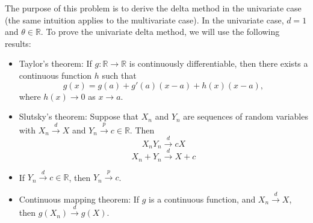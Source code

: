 \documentclass[11pt]{article}
\begin{document}
\noindent The purpose of this problem is to derive the delta method in the univariate case (the same intuition applies to the multivariate case). In the univariate case, $d = 1$ and $\theta \in \mathbb{R}$. To prove the univariate delta method, we will use the following results:
\begin{itemize}
\item Taylor's theorem: If $g: \mathbb{R} \to \mathbb{R}$ is continuously differentiable, then there exists a continuous function $h$ such that
$$g(x) = g(a) + g'(a)(x - a) + h(x)(x - a),$$
where $h(x) \to 0$ as $x \to a$.

\item Slutsky's theorem: Suppose that $X_n$ and $Y_n$ are sequences of random variables with $X_n \overset{d}{\to} X$ and $Y_n \overset{p}{\to} c \in \mathbb{R}$. Then
$$X_n Y_n \overset{d}{\to} cX$$
$$X_n + Y_n \overset{d}{\to} X + c$$

\item If $Y_n \overset{d}{\to} c \in \mathbb{R}$, then $Y_n \overset{p}{\to} c$.

\item Continuous mapping theorem: If $g$ is a continuous function, and $X_n \overset{d}{\to} X$, then $g(X_n) \overset{d}{\to} g(X)$.
\end{itemize}
\end{document}
